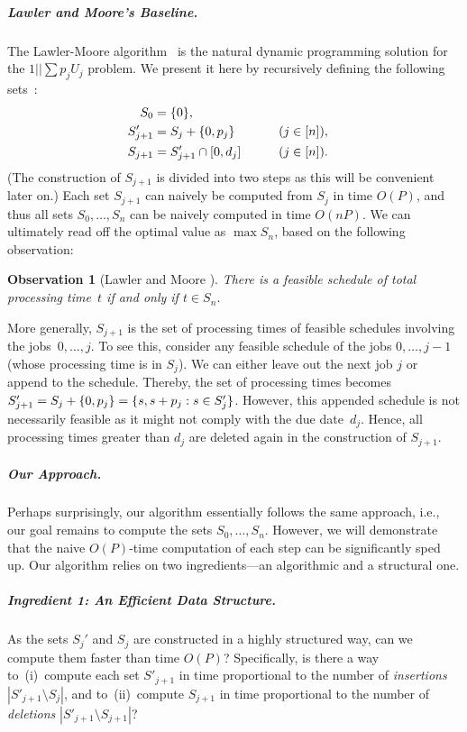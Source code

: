 \documentclass[10pt,a4paper]{article}
\newtheorem{observation}{Observation}[section]
\DeclarePairedDelimiter\set{\lbrace}{\rbrace}
\newcommand\Order{O}
\begin{document}
\subparagraph{Lawler and Moore's Baseline.}
The Lawler-Moore algorithm~\cite{LawlerM69} is the natural dynamic programming solution for the $1||\sum p_j U_j$ problem. We present it here by recursively defining the following sets~:
\begin{alignat*}{2}
    S_0 &= \set{0}, \\
    S'_{j+1} &=  S_{j} + \set{0, p_j} \qquad && (j \in [n]), \\
    S_{j+1} &= S'_{j+1} \cap [0,d_{j}]  \qquad && (j \in [n]).
\end{alignat*}
(The construction of $S_{j+1}$ is divided into two steps as this will be convenient later on.) Each set $S_{j+1}$ can naively be computed from $S_j$ in time $\Order(P)$, and thus all sets $S_0, \dots, S_n$ can be naively computed in time $\Order(nP)$. We can ultimately read off the optimal value as $\max S_n$, based on the following observation:

\begin{observation}[Lawler and Moore \cite{LawlerM69}]
    \label{obs:s-sets}
    There is a feasible schedule of total processing time~$t$ if and only if $t \in S_n$.
\end{observation}

More generally, $S_{j+1}$ is the set of processing times of feasible schedules involving the jobs~$0, \dots, j$. To see this, consider any feasible schedule of the jobs $0, \dots, j-1$ (whose processing time is in $S_j$). We can either leave out the next job $j$ or append to the schedule. Thereby, the set of processing times becomes $S'_{j+1} = S_j + \set{0, p_j} = \set{s, s + p_j : s \in S'_{j}}$. However, this appended schedule is not necessarily feasible as it might not comply with the due date~$d_j$. Hence, all processing times greater than $d_j$ are deleted again in the construction of $S_{j+1}$.

\subparagraph{Our Approach.}
Perhaps surprisingly, our algorithm essentially follows the same approach, i.e., our goal remains to compute the sets $S_0, \dots, S_n$. However, we will demonstrate that the naive $\Order(P)$-time computation of each step can be significantly sped up. Our algorithm relies on two ingredients---an algorithmic and a structural one.

\subparagraph{Ingredient 1: An Efficient Data Structure.}
As the sets $S_j'$ and $S_j$ are constructed in a highly structured way, can we compute them faster than time $\Order(P)$? Specifically, is there a way to~(i)~compute each set $S'_{j+1}$ in time proportional to the number of \emph{insertions} $|S'_{j+1} \setminus S_j|$, and to~(ii)~compute $S_{j+1}$ in time proportional to the number of \emph{deletions} $|S'_{j+1} \setminus S_{j+1}|$?
\end{document}
